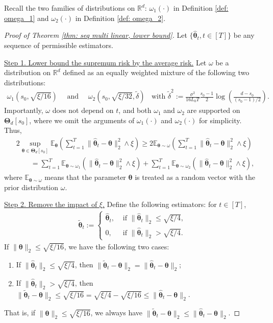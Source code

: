 \documentclass[aos,preprint]{imsart}
\theoremstyle{plain}
\theoremstyle{definition}
\newcommand{\bTheta}{\boldsymbol{\Theta}}
\newcommand{\btheta}{\boldsymbol{\theta}}
\newcommand{\hbtheta}{\widehat{\boldsymbol{\theta}}}
\newcommand{\bR}{\mathbb{R}}
\newcommand{\Exp}{\mathbb{E}}
\begin{document}
\begin{appendix}
Recall the two families of distributions on $\bR^{d}$: $\omega_1(\cdot)$ in Definition \ref{def: omega_1} and $\omega_2(\cdot)$ in Definition \ref{def: omega_2}.

\begin{proof}[Proof of Theorem \ref{thm: seq multi linear, lower bound}]
Let $\{\hbtheta_t, t\in [T]\}$ be any sequence of permissible estimators.

\medskip
\noindent \underline{Step 1. Lower bound the supremum risk by the average risk.}  Let $\omega$ be a distribution on $\bR^{d}$ defined as an equally weighted mixture of the following two distributions:
\begin{align*}
    \omega_1(s_0, \sqrt{\xi/16}) \quad \text{ and } \quad 
    \omega_2(s_0, \sqrt{\xi/32}, 
    \tilde{\delta}) \;\; \text{ with } 
    \tilde{\delta}^2 := \frac{\sigma^2}{16 L_0 T} \frac{s_0-1}{2} \log\left( \frac{d-s_0}{(s_0-1)/2}\right).
\end{align*}
Importantly, $\omega$ does not depend on $t$, and both $\omega_1$ and $\omega_2$ are supported on $\bTheta_d[s_0]$, where we omit the arguments of $\omega_1(\cdot)$ and $\omega_2(\cdot)$ for simplicity. Thus,
\begin{align*}
   &2 \sup_{\btheta\in \bTheta_d[s_0]} \Exp_{\btheta} \left(\sum_{t=1}^{T}  \|\hbtheta_t-\btheta\|_2^2\wedge \xi \right) \geq 
    2\Exp_{\btheta \sim \omega}\left( \sum_{t=1}^{T}   \|\hbtheta_t-\btheta\|_2^2\wedge \xi  \right) \\
    &\qquad =\sum_{t=1}^{T}      \Exp_{\btheta \sim \omega_1}\left(  \|\hbtheta_t-\btheta\|_2^2\wedge \xi  \right) + 
   \sum_{t=1}^{T} \Exp_{\btheta \sim \omega_2}\left(    \|{\hbtheta}_t-\btheta\|_2^2\wedge \xi  \right),
\end{align*}
where $\Exp_{\btheta \sim \omega}$ means that the parameter $\btheta$ is treated as a random vector with the prior distribution $\omega$. 


\medskip
\noindent \underline{Step 2. Remove the impact of $\xi$.} Define the following estimators: for $t \in [T]$,
\begin{align*}
    \widetilde{\btheta}_t := \begin{cases}
        \hbtheta_t, & \text{ if } \|\hbtheta_t\|_2 \leq \sqrt{\xi/4}, \\
        0, & \text{ if } \|\hbtheta_t\|_2 > \sqrt{\xi/4}. 
    \end{cases}
\end{align*}
If $\|\btheta\|_2 \leq \sqrt{\xi/16}$, we have the following two cases:
\begin{enumerate}[label=\roman*)]
    \item If $\|\hbtheta_t\|_2 \leq \sqrt{\xi/4}$, then $\|\widetilde{\btheta}_t - \btheta\|_2 =   \|\hbtheta_t- \btheta\|_2$;
    \item If $\|\hbtheta_t\|_2 > \sqrt{\xi/4}$, then 
    $\|\widetilde{\btheta}_t - \btheta\|_2 \leq \sqrt{\xi/16} =    \sqrt{\xi/4} - \sqrt{\xi/16} \leq \|\hbtheta_t- \btheta\|_2$.
\end{enumerate}
That is, if $\|\btheta\|_2 \leq \sqrt{\xi/16}$, we always have $\|\widetilde{\btheta}_t - \btheta\|_2 \leq   \|\hbtheta_t- \btheta\|_2$.


\end{proof}
\end{appendix}
\end{document}
